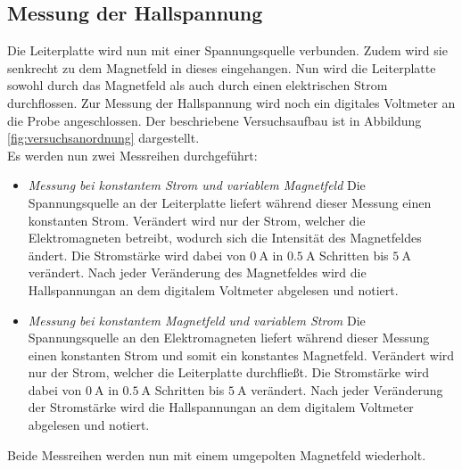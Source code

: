 \subsection{Messung der Hallspannung}
Die Leiterplatte wird nun mit einer Spannungsquelle verbunden. Zudem wird sie 
senkrecht zu dem Magnetfeld in dieses eingehangen. Nun wird die Leiterplatte sowohl durch das Magnetfeld
als auch durch einen elektrischen Strom durchflossen. Zur Messung der Hallspannung wird noch ein 
digitales Voltmeter an die Probe angeschlossen. Der beschriebene Versuchsaufbau ist in Abbildung
\ref{fig:versuchsanordnung} dargestellt.\\
Es werden nun zwei Messreihen durchgeführt:
\begin{itemize}
    \item \textit{Messung bei konstantem Strom und variablem Magnetfeld}
        Die Spannungsquelle an der Leiterplatte liefert während dieser Messung einen konstanten Strom. 
        Verändert wird nur der Strom, welcher die Elektromagneten betreibt, wodurch sich die Intensität
        des Magnetfeldes ändert. Die Stromstärke wird dabei von $\SI{0}{\ampere}$ in $\SI{0.5}{\ampere}$
        Schritten bis $\SI{5}{\ampere}$ verändert. Nach jeder Veränderung des Magnetfeldes wird die 
        Hallspannungan an dem digitalem Voltmeter abgelesen und notiert.\\
    \item \textit{Messung bei konstantem Magnetfeld und variablem Strom}
        Die Spannungsquelle an den Elektromagneten liefert während dieser Messung einen konstanten Strom und 
        somit ein konstantes Magnetfeld. 
        Verändert wird nur der Strom, welcher die Leiterplatte durchfließt.
        Die Stromstärke wird dabei von $\SI{0}{\ampere}$ in $\SI{0.5}{\ampere}$
        Schritten bis $\SI{5}{\ampere}$ verändert. Nach jeder Veränderung der Stromstärke wird die 
        Hallspannungan an dem digitalem Voltmeter abgelesen und notiert.\\
\end{itemize}
Beide Messreihen werden nun mit einem umgepolten Magnetfeld wiederholt.